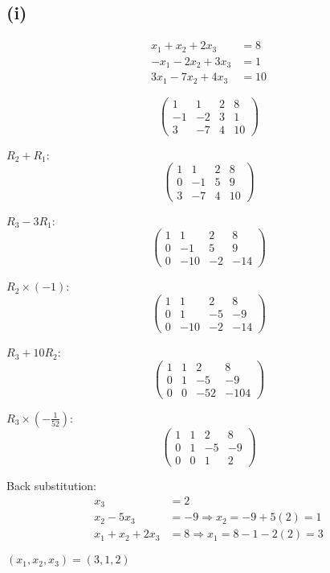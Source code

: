 \subsection*{(i)}
\begin{align*}
	x_1 + x_2 + 2x_3   & = 8  \\
	-x_1 - 2x_2 + 3x_3 & = 1  \\
	3x_1 - 7x_2 + 4x_3 & = 10
\end{align*}

\[
	\left(\begin{array}{ccc|c}
			1  & 1  & 2 & 8  \\
			-1 & -2 & 3 & 1  \\
			3  & -7 & 4 & 10
		\end{array}\right)
\]

$R_2 + R_1$:
\[
	\left(\begin{array}{ccc|c}
			1 & 1   & 2  & 8   \\
			0 & -1  & 5  & 9   \\
			3  & -7 & 4 & 10
		\end{array}\right)
\]

$R_3 - 3R_1$:
\[
	\left(\begin{array}{ccc|c}
			1 & 1   & 2  & 8   \\
			0 & -1  & 5  & 9   \\
			0 & -10 & -2 & -14
		\end{array}\right)
\]

$R_2 \times (-1)$:
\[
	\left(\begin{array}{ccc|c}
			1 & 1   & 2  & 8   \\
			0 & 1   & -5 & -9  \\
			0 & -10 & -2 & -14
		\end{array}\right)
\]

$R_3 + 10R_2$:
\[
	\left(\begin{array}{ccc|c}
			1 & 1 & 2   & 8    \\
			0 & 1 & -5  & -9   \\
			0 & 0 & -52 & -104
		\end{array}\right)
\]

$R_3 \times (-\frac{1}{52})$:
\[
	\left(\begin{array}{ccc|c}
			1 & 1 & 2  & 8  \\
			0 & 1 & -5 & -9 \\
			0 & 0 & 1  & 2
		\end{array}\right)
\]

Back substitution:
\begin{align*}
	x_3 &= 2 \\
	x_2 - 5x_3 &= -9 \Rightarrow x_2 = -9 + 5(2) = 1 \\
	x_1 + x_2 + 2x_3 &= 8 \Rightarrow x_1 = 8 - 1 - 2(2) = 3
\end{align*}

$\boxed{(x_1, x_2, x_3) = (3, 1, 2)}$